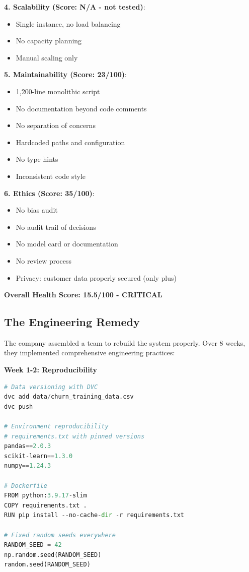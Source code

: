 \textbf{4. Scalability (Score: N/A - not tested)}:
\begin{itemize}
    \item Single instance, no load balancing
    \item No capacity planning
    \item Manual scaling only
\end{itemize}

\textbf{5. Maintainability (Score: 23/100)}:
\begin{itemize}
    \item [-] 1,200-line monolithic script
    \item [-] No documentation beyond code comments
    \item [-] No separation of concerns
    \item [-] Hardcoded paths and configuration
    \item [-] No type hints
    \item [-] Inconsistent code style
\end{itemize}

\textbf{6. Ethics (Score: 35/100)}:
\begin{itemize}
    \item [-] No bias audit
    \item [-] No audit trail of decisions
    \item [-] No model card or documentation
    \item [-] No review process
    \item [+] Privacy: customer data properly secured (only plus)
\end{itemize}

\textbf{Overall Health Score: 15.5/100 - CRITICAL}

\subsection{The Engineering Remedy}

The company assembled a team to rebuild the system properly. Over 8 weeks, they implemented comprehensive engineering practices:

\textbf{Week 1-2: Reproducibility}
\begin{lstlisting}[language=Python]
# Data versioning with DVC
dvc add data/churn_training_data.csv
dvc push

# Environment reproducibility
# requirements.txt with pinned versions
pandas==2.0.3
scikit-learn==1.3.0
numpy==1.24.3

# Dockerfile
FROM python:3.9.17-slim
COPY requirements.txt .
RUN pip install --no-cache-dir -r requirements.txt

# Fixed random seeds everywhere
RANDOM_SEED = 42
np.random.seed(RANDOM_SEED)
random.seed(RANDOM_SEED)
\end{lstlisting}

